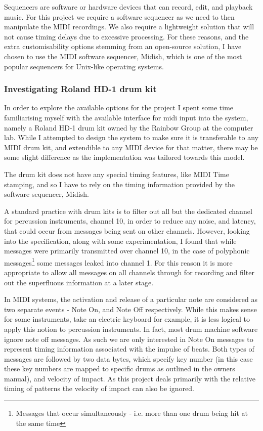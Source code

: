 \documentclass[12pt,twoside,notitlepage]{report}
\begin{document}
		Sequencers are software or hardware devices that can record, edit, and playback music. For this project we require a software sequencer as we need to then manipulate the MIDI recordings. We also require a lightweight solution that will not cause timing delays due to excessive processing. For these reasons, and the extra customisability options stemming from an open-source solution, I have chosen to use the MIDI software sequencer, Midish\footnotemark {}, which is one of the most popular sequencers for Unix-like operating systems.
		
		
		
			\subsubsection{Investigating Roland HD-1 drum kit}
			In order to explore the available options for the project I spent some time familiarising myself with the available interface for midi input into the system, namely a Roland HD-1 drum kit owned by the Rainbow Group at the computer lab. While I attempted to design the system to make sure it is transferable to any MIDI drum kit, and extendible to any MIDI device for that matter, there may be some slight difference as the implementation was tailored towards this model.

			The drum kit does not have any special timing features, like MIDI Time stamping, and so I have to rely on the timing information provided by the software sequencer, Midish. 
			
			A standard practice with drum kits is to filter out all but the dedicated channel for percussion instruments, channel 10, in order to reduce any noise, and latency, that could occur from messages being sent on other channels. However, looking into the specification, along with some experimentation, I found that while messages were primarily transmitted over channel 10, in the case of polyphonic messages\footnote{Messages that occur simultaneously - i.e. more than one drum being hit at the same time} some messages leaked into channel 1. For this reason it is more appropriate to allow all messages on all channels through for recording and filter out the superfluous information at a later stage.			
			
			In MIDI systems, the activation and release of a particular note are considered as two separate events - Note On, and Note Off respectively. While this makes sense for some instruments, take an electric keyboard for example, it is less logical to apply this notion to percussion instruments. In fact, most drum machine software ignore note off messages. As such we are only interested in Note On messages to represent timing information associated with the impulse of beats. Both types of messages are followed by two data bytes, which specify key number (in this case these key numbers are mapped to specific drums as outlined in the owners manual\cite{Roland}), and velocity of impact. As this project deals primarily with the relative timing of patterns the velocity of impact can also be ignored.
			
\end{document}

